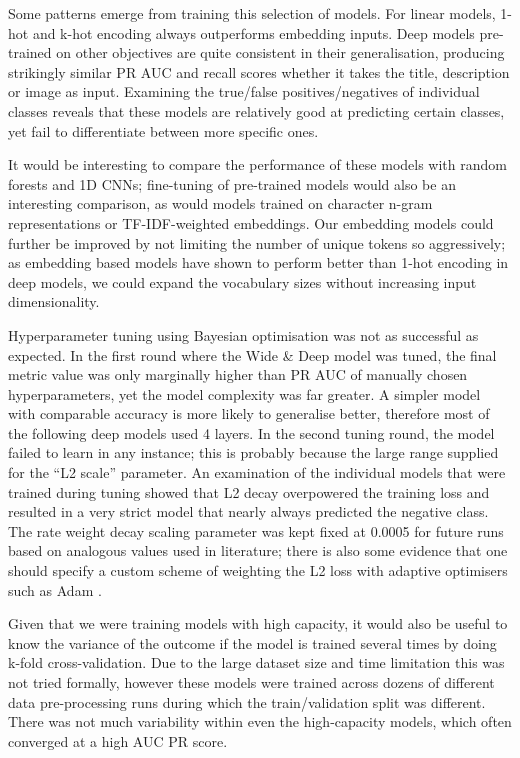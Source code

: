 Some patterns emerge from training this selection of models.
For linear models, 1-hot and k-hot encoding always outperforms embedding inputs.
Deep models pre-trained on other objectives are quite consistent in their generalisation, producing strikingly similar PR AUC and recall scores whether it takes the title, description or image as input.
Examining the true/false positives/negatives of individual classes reveals that these models are relatively good at predicting certain classes, yet fail to differentiate between more specific ones.

It would be interesting to compare the performance of these models with random forests and 1D CNNs; fine-tuning of pre-trained models would also be an interesting comparison, as would models trained on character n-gram representations or TF-IDF-weighted embeddings.
Our embedding models could further be improved by not limiting the number of unique tokens so aggressively; as embedding based models have shown to perform better than 1-hot encoding in deep models, we could expand the vocabulary sizes without increasing input dimensionality.

Hyperparameter tuning using Bayesian optimisation was not as successful as expected.
In the first round where the Wide \& Deep model was tuned, the final metric value was only marginally higher than PR AUC of manually chosen hyperparameters, yet the model complexity was far greater.
A simpler model with comparable accuracy is more likely to generalise better, therefore most of the following deep models used 4 layers.
In the second tuning round, the model failed to learn in any instance; this is probably because the large range supplied for the ``L2 scale'' parameter.
An examination of the individual models that were trained during tuning showed that L2 decay overpowered the training loss and resulted in a very strict model that nearly always predicted the negative class.
The rate weight decay scaling parameter was kept fixed at 0.0005 for future runs based on analogous values used in literature; there is also some evidence that one should specify a custom scheme of weighting the L2 loss with adaptive optimisers such as Adam \cite{fix_adam}.

Given that we were training models with high capacity, it would also be useful to know the variance of the outcome if the model is trained several times by doing k-fold cross-validation.
Due to the large dataset size and time limitation this was not tried formally, however these models were trained across dozens of different data pre-processing runs during which the train/validation split was different.
There was not much variability within even the high-capacity models, which often converged at a high AUC PR score.

